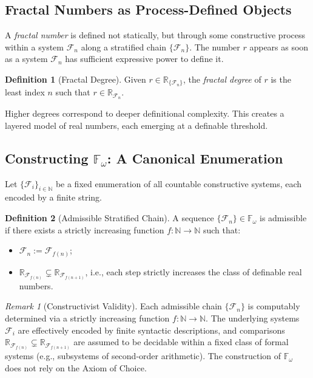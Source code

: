 \documentclass[12pt]{article}
\theoremstyle{definition}
\newtheorem{definition}{Definition}[section]
\theoremstyle{plain}
\theoremstyle{remark}
\newtheorem*{remark}{Remark}
\begin{document}
\subsection*{Fractal Numbers as Process-Defined Objects}

A \emph{fractal number} is defined not statically, but through some constructive process within a system \( \mathcal{F}_n \) along a stratified chain \( \{ \mathcal{F}_n \} \). The number \( r \) appears as soon as a system \( \mathcal{F}_n \) has sufficient expressive power to define it.

\begin{definition}[Fractal Degree]
Given \( r \in \mathbb{R}_{\{\mathcal{F}_n\}} \), the \emph{fractal degree} of \( r \) is the least index \( n \) such that \( r \in \mathbb{R}_{\mathcal{F}_n} \).
\end{definition}

Higher degrees correspond to deeper definitional complexity. This creates a layered model of real numbers, each emerging at a definable threshold.

\subsection*{Constructing \( \mathbb{F}_\omega \): A Canonical Enumeration}

Let \( \{ \mathcal{F}_i \}_{i \in \mathbb{N}} \) be a fixed enumeration of all countable constructive systems, each encoded by a finite string. 

\begin{definition}[Admissible Stratified Chain]
A sequence \( \{ \mathcal{F}_n \} \in \mathbb{F}_\omega \) is admissible if there exists a strictly increasing function \( f: \mathbb{N} \to \mathbb{N} \) such that:
\begin{itemize}
    \item \( \mathcal{F}_n := \mathcal{F}_{f(n)} \);
    \item \( \mathbb{R}_{\mathcal{F}_{f(n)}} \subsetneq \mathbb{R}_{\mathcal{F}_{f(n+1)}} \), i.e., each step strictly increases the class of definable real numbers.
\end{itemize}
\end{definition}

\begin{remark}[Constructivist Validity]
Each admissible chain \( \{ \mathcal{F}_n \} \) is computably determined via a strictly increasing function \( f: \mathbb{N} \to \mathbb{N} \). The underlying systems \( \mathcal{F}_i \) are effectively encoded by finite syntactic descriptions, and comparisons \( \mathbb{R}_{\mathcal{F}_{f(n)}} \subsetneq \mathbb{R}_{\mathcal{F}_{f(n+1)}} \) are assumed to be decidable within a fixed class of formal systems (e.g., subsystems of second-order arithmetic). The construction of \( \mathbb{F}_\omega \) does not rely on the Axiom of Choice.
\end{remark}
\end{document}
